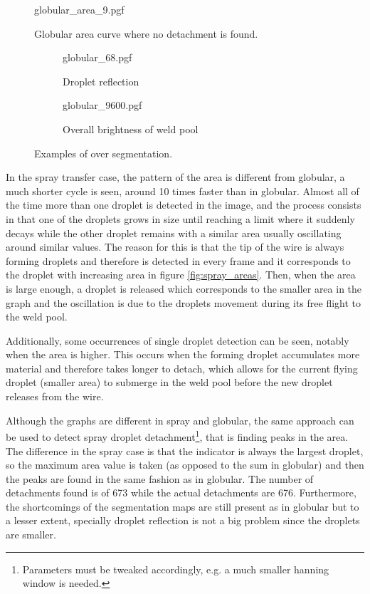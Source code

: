  \begin{figure}
 \centering
    {globular_area_9.pgf}
    \caption[Globular area curve where no detachment is found]{Globular area curve where no detachment is found.}
    \label{fig:no_detachment}
\end{figure}
\begin{figure}
  \begin{subfigure}[b]{\textwidth}
    {globular_68.pgf}
    \caption{Droplet reflection}

  \end{subfigure}
\vfill
  \begin{subfigure}[b]{\textwidth}
    {globular_9600.pgf}
    \caption{Overall brightness of weld pool}
  \end{subfigure}
\caption[Examples of over segmentation]{Examples of over segmentation.} 
\label{fig:reflection}
\end{figure}

 In the spray transfer case, the pattern of the area is different from globular, a much shorter cycle is seen, around 10 times faster than in globular. Almost all of the time more than one droplet is detected in the image, and the process consists in that one of the droplets grows in size until reaching a limit where it suddenly decays while the other droplet remains with a similar area usually oscillating around similar values. The reason for this is that the tip of the wire is always forming droplets and therefore is detected in every frame and it corresponds to the droplet with increasing area in figure \ref{fig:spray_areas}. Then, when the area is large enough, a droplet is released which corresponds to the smaller area in the graph and the oscillation is due to the droplets movement during its free flight to the weld pool.
 
 Additionally, some occurrences of single droplet detection can be seen, notably when the area is higher. This occurs when the forming droplet accumulates more material and therefore takes longer to detach, which allows for the current flying droplet (smaller area) to submerge in the weld pool before the new droplet releases from the wire.

Although the graphs are different in spray and globular, the same approach can be used to detect spray droplet detachment\footnote{Parameters must be tweaked accordingly, e.g. a much smaller hanning window is needed.}, that is finding peaks in the area. The difference in the spray case is that the indicator is always the largest droplet, so the maximum area value is taken (as opposed to the sum in globular) and then the peaks are found in the same fashion as in globular. The number of detachments found is of 673 while the actual detachments are 676. Furthermore, the shortcomings of the segmentation maps are still present as in globular but to a lesser extent, specially droplet reflection is not a big problem since the droplets are smaller.

